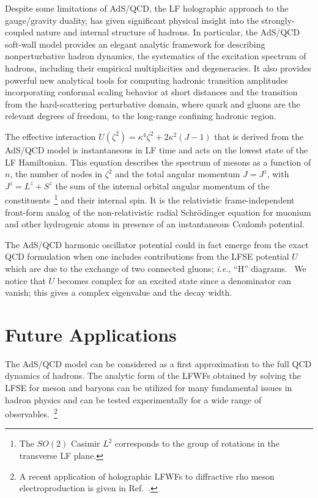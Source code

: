 \documentclass[prd,aps,onecolumn,nofootinbib]{revtex4}
\begin{document}
Despite some limitations of AdS/QCD, the LF holographic  approach to the gauge/gravity duality,  has  given significant physical  insight into the strongly-coupled nature and internal structure of hadrons.  In particular, the AdS/QCD soft-wall model provides an elegant analytic framework for describing  nonperturbative  hadron dynamics, the systematics of the excitation spectrum of hadrons, including their empirical multiplicities and degeneracies. It also provides powerful new analytical tools for computing hadronic transition amplitudes incorporating conformal scaling behavior at short distances and the transition from the hard-scattering perturbative domain, where quark and gluons are the relevant degrees of freedom, to the long-range confining hadronic region.   




The effective interaction $ U(\zeta^2) = \kappa^4 \zeta^2 + 2 \kappa^2(J-1)$  that is derived from the AdS/QCD model is instantaneous in LF time and acts on the lowest state of the LF Hamiltonian.  This equation describes the spectrum of mesons as a function of $n$, the number of nodes in $\zeta^2$ and the total angular momentum $J=J^z$,
with $J^z = L^z + S^z$  the sum of the internal orbital angular momentum of the constituents~\footnote{The  $SO(2)$ Casimir  $L^2$  corresponds to  the group of rotations in the transverse LF plane.} and their internal spin.
It is the relativistic frame-independent front-form analog of the non-relativistic radial Schr\"odinger equation for muonium  and other hydrogenic atoms in presence of an instantaneous Coulomb potential.

The AdS/QCD harmonic oscillator potential could in fact emerge from the exact QCD formulation when one includes contributions from the LFSE potential $U$ which are due to the exchange of two connected gluons; {\it i.e.}, ``H'' diagrams.~\cite{Appelquist:1977tw}
We notice that $U$ becomes complex for an excited state since a denominator can vanish; this gives a complex eigenvalue and the decay width.

\section{Future Applications}

The  AdS/QCD model can be considered as a first approximation to the full QCD dynamics of hadrons.  The analytic form of the LFWFs obtained by solving the LFSE for meson and baryons can be utilized for many fundamental issues in hadron physics  and can be tested experimentally for a wide range of observables.~\footnote{A recent application of holographic LFWFs to diffractive rho meson electroproduction is given in Ref.~\cite{Forshaw:2012im}.}
\end{document}
